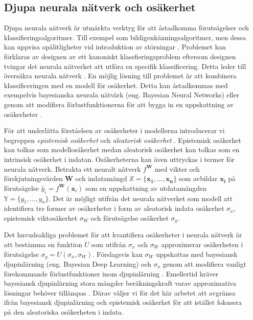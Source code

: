 \subsection{Djupa neurala nätverk och osäkerhet}
\label{NN_and_uncert}
Djupa neurala nätverk är utmärkta verktyg för att åstadkomma förutsägelser och klassifieringsalgoritmer. Till exempel som bildigenkänningsalgoritmer, men dessa kan uppvisa opålitligheter vid introduktion av störningar \cite{Elephant}. Problemet kan förklaras av designen av ett kanoniskt klassfieringsproblem eftersom designen tvingar det neurala nätverket att utföra en specifik klassificering. Detta leder till översäkra neurala nätverk \cite{Kendall-Gal}. En möjlig lösning till problemet är att kombinera klassificeringen med en modell för osäkerhet. Detta kan åstadkommas med exempelvis bayesianska neurala nätvärk (eng. Bayesian Neural Networks) eller genom att modifiera förlustfunktionerna för att bygga in en uppskattning av osäkerheter \cite{Kendall-Gal}.

För att underlätta förståelsen av osäkerheter i modellerna introducerar vi begreppen \emph{epistemisk osäkerhet} och \emph{aleatorisk osäkerhet} \cite{Uncert}. Epistemisk osäkerhet kan tolkas som modellosäkerhet medan aleatorisk osäkerhet kan tolkas som en intrinsisk osäkerhet i indatan. Osäkerheterna kan även uttryckas i termer för neurala nätverk. Betrakta ett neuralt nätverk $f^\mathbf{W}$ med vikter och förskjutningsvärden $\mathbf{W}$ och indatamängd $\mathbb{X} = \{\mathbf{x_1},..., \mathbf{x_n}\}$ som avbildar $\mathbf{x_i}$ på förutsägelse $\hat{y}_i = f^\mathbf{W}(\mathbf{x}_i)$ som en uppskattning av utdatamängden $\mathbb{Y} = \{y_1,..., y_n\}$. Det är möjligt utifrån det neurala nätverket som modell att identifiera tre former av osäkerheter i form av aleatorisk indata osäkerhet $\sigma_x$, epistemisk viktosäkerhet $\sigma_W$ och förutsägelse osäkerhet $\sigma_y$.

Det huvudsakliga problemet för att kvantifiera osäkerheter i neurala nätverk är att bestämma en funktion $U$ som utifrån $\sigma_x$ och $\sigma_W$ approximerar osäkerheten i förutsägelse $\sigma_y = U(\sigma_x, \sigma_W)$. Förslagsvis kan $\sigma_W$ uppskattas med bayesiansk djupinlärning (eng. Bayesian Deep Learning) och $\sigma_x$ genom att modifiera vanligt förekommande förlustfunktioner inom djupinlärning \cite{Kendall-Gal}. Emellertid kräver bayesiansk djupinlärning stora mängder beräkningskraft varav approximativa lösningar behöver tillämpas \cite{MC-dropout}. Därav väljer vi för det här arbetet att avgränsa ifrån bayesiansk djupinlärning och epistemisk osäkerhet för att istället fokusera på den aleatoriska osäkerheten i indata. 

